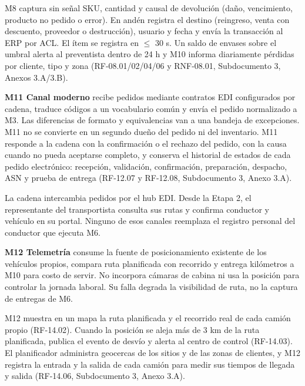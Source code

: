 M8 captura sin señal SKU, cantidad y causal de devolución (daño, vencimiento, producto no pedido o error). En andén registra el destino (reingreso, venta con descuento, proveedor o destrucción), usuario y fecha y envía la transacción al ERP por ACL. El ítem se registra en $\leq$ 30 s. Un saldo de envases sobre el umbral alerta al preventista dentro de 24 h y M10 informa diariamente pérdidas por cliente, tipo y zona (RF-08.01/02/04/06 y RNF-08.01, Subdocumento 3, Anexos 3.A/3.B).

\textbf{M11 Canal moderno} recibe pedidos mediante contratos EDI configurados por cadena, traduce códigos a un vocabulario común y envía el pedido normalizado a M3. Las diferencias de formato y equivalencias van a una bandeja de excepciones. M11 no se convierte en un segundo dueño del pedido ni del inventario. M11 responde a la cadena con la confirmación o el rechazo del pedido, con la causa cuando no pueda aceptarse completo, y conserva el historial de estados de cada pedido electrónico: recepción, validación, confirmación, preparación, despacho, ASN y prueba de entrega (RF-12.07 y RF-12.08, Subdocumento 3, Anexo 3.A).

La cadena intercambia pedidos por el hub EDI. Desde la Etapa 2, el representante del transportista consulta sus rutas y confirma conductor y vehículo en su portal. Ninguno de esos canales reemplaza el registro personal del conductor que ejecuta M6.

\textbf{M12 Telemetría} consume la fuente de posicionamiento existente de los vehículos propios, compara ruta planificada con recorrido y entrega kilómetros a M10 para costo de servir. No incorpora cámaras de cabina ni usa la posición para controlar la jornada laboral. Su falla degrada la visibilidad de ruta, no la captura de entregas de M6.

M12 muestra en un mapa la ruta planificada y el recorrido real de cada camión propio (RF-14.02). Cuando la posición se aleja más de 3 km de la ruta planificada, publica el evento de desvío y alerta al centro de control (RF-14.03). El planificador administra geocercas de los sitios y de las zonas de clientes, y M12 registra la entrada y la salida de cada camión para medir sus tiempos de llegada y salida (RF-14.06, Subdocumento 3, Anexo 3.A).
